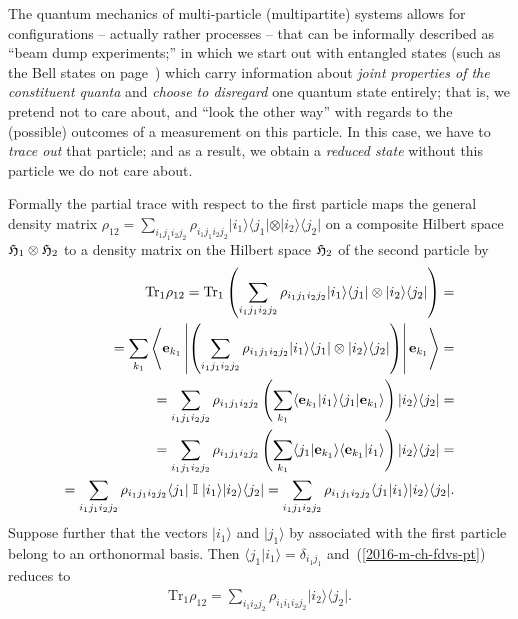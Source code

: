 The quantum mechanics of multi-particle (multipartite) systems allows for configurations -- actually rather processes --
that can be informally described as ``beam dump experiments;'' in which we start out with entangled states
(such as the Bell states on page~\pageref{2014-m-ch-fdvs-bellbasis})  which carry information
about {\em joint properties of the constituent quanta}
and {\em choose to disregard} one quantum state entirely; that is, we pretend
not to care about, and ``look the other way'' with regards to the (possible) outcomes of a measurement on this particle.
In this case, we have to {\em trace out} that particle; and as a result, we obtain a {\em reduced state} without this particle we do
not care about.

Formally the partial trace with respect to the first particle
maps the general density matrix
${ \rho}_{12} = \sum_{i_1 j_1 i_2 j_2} \rho_{i_1 j_1 i_2 j_2}   \vert i_1\rangle \langle j_1\vert \otimes \vert i_2\rangle \langle j_2 \vert$
on a composite Hilbert space
$
{\frak H}_1
\otimes
{\frak H}_2
$
to  a density matrix on the Hilbert space
${\frak H}_2
$ of the second particle by
\begin{equation}
\begin{split}
\textrm{Tr}_1
{ \rho}_{12}
= \textrm{Tr}_1  \left(   \sum_{i_1 j_1 i_2 j_2} \rho_{i_1 j_1 i_2 j_2}   \vert i_1\rangle \langle j_1\vert \otimes \vert i_2 \rangle \langle j_2 \vert \right)
=\\
= \sum_{k_1}   \left\langle {\bf e}_{k_1}  \left\vert \left(   \sum_{i_1 j_1 i_2 j_2} \rho_{i_1 j_1 i_2 j_2}
 \vert i_1\rangle \langle j_1\vert \otimes \vert i_2 \rangle \langle j_2 \vert  \right)  \right\vert {\bf e}_{k_1} \right\rangle
=\\
=  \sum_{i_1 j_1 i_2 j_2} \rho_{i_1 j_1 i_2 j_2}  \left( \sum_{k_1}
 \langle {\bf e}_{k_1}  \vert i_1\rangle \langle j_1\vert    {\bf e}_{k_1}  \rangle  \right)  \vert i_2 \rangle \langle j_2 \vert
=\\
=  \sum_{i_1 j_1 i_2 j_2} \rho_{i_1 j_1 i_2 j_2}  \left( \sum_{k_1}
 \langle j_1\vert    {\bf e}_{k_1}  \rangle  \langle {\bf e}_{k_1}  \vert i_1\rangle \right)  \vert i_2 \rangle \langle j_2 \vert
=\\
=  \sum_{i_1 j_1 i_2 j_2} \rho_{i_1 j_1 i_2 j_2}
 \langle j_1\vert   \; {\Bbb I} \; \vert i_1\rangle   \vert i_2 \rangle \langle j_2 \vert
=  \sum_{i_1 j_1 i_2 j_2} \rho_{i_1 j_1 i_2 j_2}
 \langle j_1 \vert  i_1\rangle    \vert i_2 \rangle \langle j_2 \vert
.
\end{split}
\label{2016-m-ch-fdvs-pt}
\end{equation}
Suppose further that the vectors
$\vert i_1 \rangle$
and
$\vert j_1 \rangle$
by   associated with the first particle
belong to an orthonormal basis.
Then $\langle j_1 \vert  i_1\rangle =\delta_{i_1 j_1}$ and~(\ref{2016-m-ch-fdvs-pt})
reduces to
\begin{equation}
\begin{split}
\textrm{Tr}_1
{ \rho}_{12}
=  \sum_{i_1 i_2 j_2} \rho_{i_1 i_1 i_2 j_2}
  \vert i_2 \rangle \langle j_2 \vert
.
\end{split}
\label{2016-m-ch-fdvs-pt2}
\end{equation}

